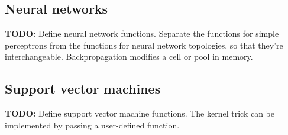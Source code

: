 \documentclass{article}
\theoremstyle{definition}
\begin{document}
\subsection{Neural networks}

{\bf TODO:} Define neural network functions.  Separate the functions for simple perceptrons from the functions for neural network topologies, so that they're interchangeable.  Backpropagation modifies a cell or pool in memory.

\subsection{Support vector machines}

{\bf TODO:} Define support vector machine functions.  The kernel trick can be implemented by passing a user-defined function.
\end{document}
